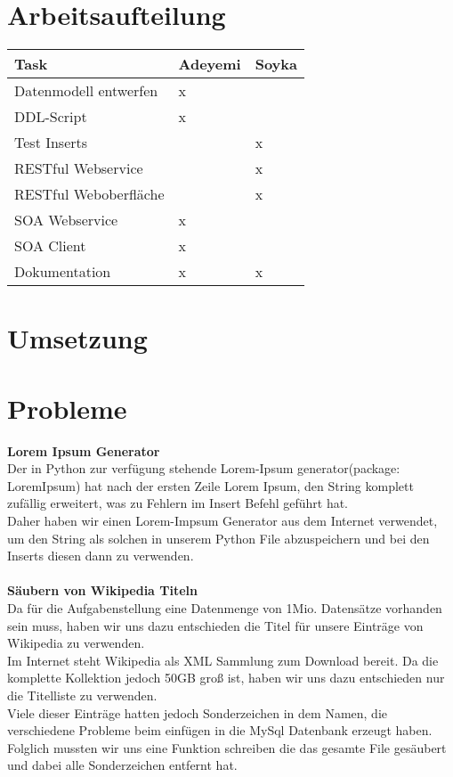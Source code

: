 \documentclass[11pt]{article}
\begin{document}
\section{Arbeitsaufteilung}
\begin{center}
  \begin{tabular}{| l | l | l |}
        \hline
		Task & Adeyemi & Soyka  \\ \hline \hline
    	Datenmodell entwerfen & x & \\ \hline
		DDL-Script & x & \\ \hline
    	Test Inserts  &  & x\\ \hline 
		RESTful Webservice &  & x\\ \hline 
    	RESTful Weboberfläche &  & x\\ \hline 
    	SOA Webservice & x & \\ \hline
		SOA Client & x & \\ \hline
		Dokumentation & x & x\\ \hline

  \end{tabular}
\end{center}

\section{Umsetzung}


\section{Probleme}
\textbf{Lorem Ipsum Generator}\\
Der in Python zur verfügung stehende Lorem-Ipsum generator(package: LoremIpsum) hat nach der ersten Zeile Lorem Ipsum, den String komplett zufällig erweitert, was zu Fehlern im Insert Befehl geführt hat.\\
Daher haben wir einen Lorem-Impsum Generator aus dem Internet verwendet, um den String als solchen in unserem Python File abzuspeichern und bei den Inserts diesen dann zu verwenden.\\
\\
\textbf{Säubern von Wikipedia Titeln}\\
Da für die Aufgabenstellung eine Datenmenge von 1Mio. Datensätze vorhanden sein muss, haben wir uns dazu entschieden die Titel für unsere Einträge von Wikipedia zu verwenden.\\
Im Internet steht Wikipedia als XML Sammlung zum Download bereit. Da die komplette Kollektion jedoch 50GB groß ist, haben wir uns dazu entschieden nur die Titelliste zu verwenden.\\
Viele dieser Einträge hatten jedoch Sonderzeichen in dem Namen, die verschiedene Probleme beim einfügen in die MySql Datenbank erzeugt haben. Folglich mussten wir uns eine Funktion schreiben die das gesamte File gesäubert und dabei alle Sonderzeichen entfernt hat.

	
\end{document}
